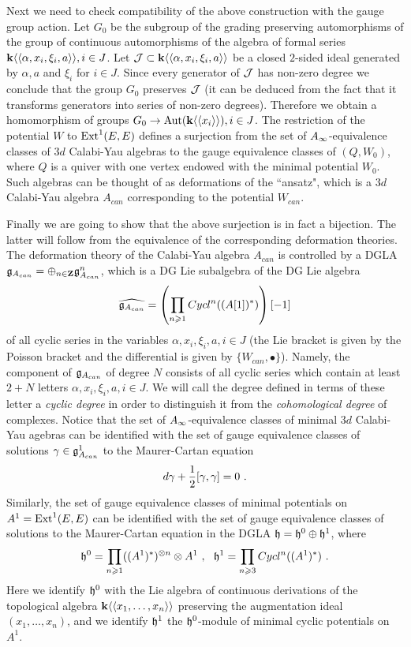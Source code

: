 \documentclass[12pt]{article}
\begin{document}
Next we need to check compatibility of the above construction with the gauge group action. Let $G_0$ be the subgroup of the grading preserving automorphisms of the group of continuous automorphisms of the algebra of formal series ${\bf k}\langle\langle \alpha,x_i,\xi_i,a\rangle\rangle, i\in J$.
Let ${\cal J}\subset  {\bf k}\langle\langle \alpha,x_i,\xi_i,a\rangle\rangle$ be a closed $2$-sided ideal generated by $\alpha,a$ and $\xi_i$ for $ i\in J$. Since every generator of ${\cal J}$ has non-zero degree we conclude that the group $G_0$ preserves ${\cal J}$ (it can be deduced from the fact that it transforms generators into series of non-zero degrees).  Therefore we obtain a homomorphism of groups $G_0\to \operatorname{Aut}({\bf k}\langle\langle x_i\rangle\rangle), i\in J$. The restriction of the potential $W$ to $\operatorname{Ext}^1(E,E)$ defines a surjection from the set of $A_{\infty}$-equivalence classes of $3d$ Calabi-Yau algebras to the gauge equivalence classes of $(Q,W_0)$, where $Q$ is a quiver with one vertex endowed with the minimal potential $W_0$. Such algebras can be thought of as deformations of the ``ansatz", which is a $3d$ Calabi-Yau algebra $A_{can}$ corresponding to the potential $W_{can}$.

Finally we are going to show that the above surjection is in fact a bijection. The latter will follow from the equivalence of the corresponding deformation theories.
The deformation theory of the Calabi-Yau algebra $A_{can}$ is controlled by a  DGLA  ${\mathfrak g}_{A_{can}}=\oplus_{n\in {\bf Z}}{\mathfrak g}_{A_{can}}^n$, which is a DG Lie subalgebra of the DG Lie algebra 
$$\widehat{{\mathfrak g}_{A_{can}}}=\left(\prod_{n\geqslant 1}Cycl^n((A[1])^{\ast})\right)[-1] $$
 of all cyclic series in the variables $\alpha,x_i,\xi_i,a, i\in J$ (the Lie bracket is given by the Poisson bracket and the differential is given by $\{W_{can},\bullet\}$). Namely, the component of ${\mathfrak g}_{A_{can}}$ of degree $N$ consists of all cyclic series which contain at least $2+N$ letters $\alpha,x_i,\xi_i,a, i\in J$. We will call the degree defined in terms of these letter a {\it cyclic degree} in order to distinguish it from the {\it cohomological degree} of complexes.
Notice that the set of $A_{\infty}$-equivalence classes of minimal $3d$ Calabi-Yau agebras can be identified with the set of gauge equivalence classes of solutions $\gamma\in {\mathfrak g}_{A_{can}}^1$ to the Maurer-Cartan equation
$$d\gamma+{1\over{2}}[\gamma,\gamma]=0\,\,.$$
Similarly, the set of gauge equivalence classes of minimal potentials on $A^1=\operatorname{Ext}^1(E,E)$ can be identified with the set of gauge equivalence classes of solutions to the Maurer-Cartan equation in the DGLA ${{\mathfrak h}}={{\mathfrak h}}^0\oplus {{\mathfrak h}}^1$, where
$${{\mathfrak h}}^0=\prod_{n\geqslant 1}((A^1)^{\ast})^{\otimes n}\otimes A^1\,\,,\,\,\,\,
{{\mathfrak h}}^1=\prod_{n\geqslant 3}Cycl^n((A^1)^{\ast})\,\,.$$
Here we identify ${{\mathfrak h}}^0$ with the Lie algebra of continuous derivations of the topological algebra ${\bf k}\langle\langle x_1,\dots,x_n\rangle\rangle$ preserving the augmentation ideal $(x_1,\dots,x_n)$, and we identify ${{\mathfrak h}}^1$ the ${{\mathfrak h}}^0$-module of minimal cyclic potentials on $A^1$.
\end{document}
